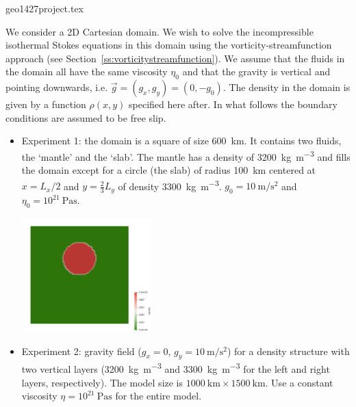 \begin{flushright} {\tiny {\color{gray} geo1427project.tex}} \end{flushright}


We consider a 2D Cartesian domain. We wish to solve the incompressible 
isothermal Stokes equations in this domain using the 
vorticity-streamfunction approach (see Section~\ref{ss:vorticitystreamfunction}). 
We assume that the fluids in the domain all have the same viscosity 
$\eta_0$ and that the gravity is vertical 
and pointing downwards, i.e.  $\vec{g}=(g_x,g_y)=(0,-g_0)$.
The density in the domain is given by a  function $\rho(x,y)$ specified
here after. In what follows the boundary conditions are assumed to be free slip. 

\begin{itemize}
\item
Experiment 1: the domain is a square of size 600~\si{\km}.  
It contains two fluids, the `mantle'  and the `slab'. 
The mantle has a density of 3200~\si{\kg\per\cubic\meter} 
and fills the domain except for a circle (the slab) of radius 100~\si{\km} 
centered at $x=L_x/2$ and $y=\frac23 L_y$  of density 
3300~\si{\kg\per\cubic\meter}. $g_0=10~\si{\meter\per\square\second}$ 
and $\eta_0=10^{21}~\si{\pascal\second}$.

\begin{center}
\includegraphics[width=5cm]{images/fdm/project/rho1}
\end{center}

\item
Experiment 2: 
gravity ﬁeld ($g_x=0$, $g_y=10~\si{\meter\per\square\second}$) 
for a density structure with two vertical layers 
(3200~\si{\kg\per\cubic\meter} and 3300~\si{\kg\per\cubic\meter} 
for the left and right layers, respectively). The model size is  
$1000~\si{\km} \times 1500~\si{\km}$.
Use a constant viscosity $\eta = 10^{21}~\si{\pascal\second}$ 
for the entire model.
\end{itemize}

